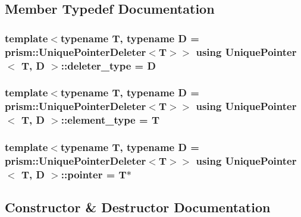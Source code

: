 \subsection{Member Typedef Documentation}
\subsubsection[{\texorpdfstring{deleter\+\_\+type}{deleter_type}}]{\setlength{\rightskip}{0pt plus 5cm}template$<$typename T, typename D = prism\+::\+Unique\+Pointer\+Deleter$<$\+T$>$$>$ using {\bf Unique\+Pointer}$<$ T, D $>$\+::{\bf deleter\+\_\+type} =  D}\hypertarget{class_unique_pointer_aea5e9d2fa26d0acca416a9e9451e08c3}{}\label{class_unique_pointer_aea5e9d2fa26d0acca416a9e9451e08c3}
\subsubsection[{\texorpdfstring{element\+\_\+type}{element_type}}]{\setlength{\rightskip}{0pt plus 5cm}template$<$typename T, typename D = prism\+::\+Unique\+Pointer\+Deleter$<$\+T$>$$>$ using {\bf Unique\+Pointer}$<$ T, D $>$\+::{\bf element\+\_\+type} =  T}\hypertarget{class_unique_pointer_a0ccc3b99b9fef0fb9a8d738793535fc2}{}\label{class_unique_pointer_a0ccc3b99b9fef0fb9a8d738793535fc2}
\subsubsection[{\texorpdfstring{pointer}{pointer}}]{\setlength{\rightskip}{0pt plus 5cm}template$<$typename T, typename D = prism\+::\+Unique\+Pointer\+Deleter$<$\+T$>$$>$ using {\bf Unique\+Pointer}$<$ T, D $>$\+::{\bf pointer} =  T$\ast$}\hypertarget{class_unique_pointer_a3894408ba9899edc0388aeb018833414}{}\label{class_unique_pointer_a3894408ba9899edc0388aeb018833414}


\subsection{Constructor \& Destructor Documentation}
